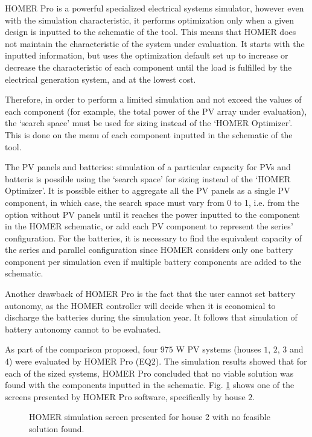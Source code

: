 HOMER Pro is a powerful specialized electrical systems simulator, however even with the simulation characteristic, it performs optimization only when a given design is inputted to the schematic of the tool. This means that HOMER does not maintain the characteristic of the system under evaluation. It starts with the inputted information, but uses the optimization default set up to increase or decrease the characteristic of each component until the load is fulfilled by the electrical generation system, and at the lowest cost. 

Therefore, in order to perform a limited simulation and not exceed the values of each component (for example, the total power of the PV array under evaluation), the `search space' must be used for sizing instead of the `HOMER Optimizer'. This is done on the menu of each component inputted in the schematic of the tool. 

The PV panels and batteries: simulation of a particular capacity for PVs and batteris is possible using the `search space' for sizing instead of the `HOMER Optimizer'. It is possible either to aggregate all the PV panels as a single PV component, in which case, the search space must vary from 0 to 1, i.e. from the option without PV panels until it reaches the power inputted to the component in the HOMER schematic, or add each PV component to represent the series' configuration. For the batteries, it is necessary to find the equivalent capacity of the series and parallel configuration since HOMER considers only one battery component per simulation even if multiple battery components are added to the schematic.

Another drawback of HOMER Pro is the fact that the user cannot set battery autonomy, as the HOMER controller will decide when it is economical to discharge the batteries during the simulation year. It follows that simulation of battery autonomy cannot to be evaluated.

As part of the comparison proposed, four $975$ W PV systems (houses $1$, $2$, $3$ and $4$) were evaluated by HOMER Pro (EQ2). The simulation results showed that for each of the sized systems, HOMER Pro concluded that no viable solution was found with the components inputted in the schematic. Fig. \ref{fig:homersimuh2no} shows one of the screens presented by HOMER Pro software, specifically by house $2$.

\begin{figure}[h]
\centering
\caption{HOMER simulation screen presented for house 2 with no feasible solution found.}
\label{fig:homersimuh2no}
\end{figure}

